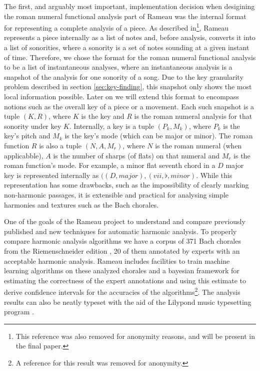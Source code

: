 The first, and arguably most important, implementation decision when
desigining the roman numeral functional analysis part of Rameau was
the internal format for representing a complete analysis of a piece.
As described in\footnote{This reference was also removed for
  anonymity reasons, and will be present in the final paper.}, Rameau
represents a piece internally as a list of notes and, before analysis,
converts it into a list of sonorities, where a sonority is a set of
notes sounding at a given instant of time. Therefore, we chose the
format for the roman numeral functional analysis to be a list of
instantaneous analyses, where an instantaneous analysis is a snapshot
of the analysis for one sonority of a song. Due to the key granularity
problem described in section \ref{sec:key-finding}, this snapshot only
shows the most local information possible. Later on we will extend
this format to encompass notions such as the overall key of a piece or
a movement. Each such snapshot is a tuple $(K,R)$, where $K$ is the
key and $R$ is the roman numeral analysis for that sonority under key
$K$. Internally, a key is a tuple $(P_k,M_k)$, where $P_k$ is the
key's pitch and $M_k$ is the key's mode (which can be major or minor).
The roman function $R$ is also a tuple $(N,A,M_r)$, where $N$ is the
roman numeral (when applicabble), $A$ is the number of sharps (of
flats) on that numeral and $M_r$ is the roman function's mode. For
example, a minor flat seventh chord in a $D$ major key is represented
internally as $((D,major),(vii,\flat,minor)$. While this
representation has some drawbacks, such as the impossibility of
clearly marking non-harmonic passages, it is extensible and practical
for analysing simple harmonies and textures such as the Bach
chorales.

One of the goals of the Rameau project to understand and compare
previously published and new techniques for automatic harmonic
analysis. To properly compare harmonic analysis algorithms we have a
corpus of 371 Bach chorales from the Riemenschneider edition
\cite{bach41:371}, 20 of them annotated by experts with an acceptable
harmonic analysis. Rameau includes facilities to train machine
learning algorithms on these analyzed chorales and a bayesian
framework for estimating the correctness of the expert annotations and
using this estimate to derive confidence intervals for the accuracies
of the algorithms\footnote{A reference for this result was removed for
  anonymity.}. The analysis results can also be neatly typeset with
the aid of the Lilypond music typesetting program
\cite{nienhuys.ea08:lilypond}.

